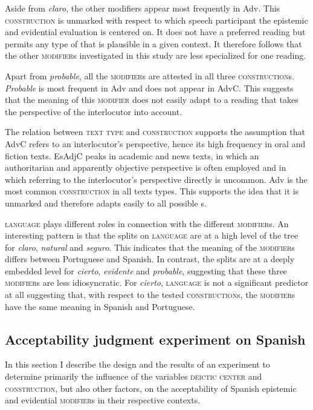 Aside from  \textit{claro}, the other modifiers  appear most frequently in Adv. This \textsc{construction} is unmarked with respect to which speech participant the epistemic and evidential evaluation is centered on. It does not have a preferred reading but permits any type of  that is plausible in a given context. It  therefore follows that the other \textsc{modifier}s investigated in this study are less specialized for one reading.  


Apart from \textit{probable}, all the \textsc{modifier}s are attested in all  three \textsc{construction}s. \textit{Probable} is most frequent in Adv and does not appear in AdvC. This suggests that the meaning of this \textsc{modifier} does not easily adapt to a reading that takes the perspective of the interlocutor into account.

The relation between \textsc{text type} and \textsc{construction} supports the assumption that AdvC refers to an interlocutor's perspective, hence its high frequency in oral and fiction texts. EsAdjC peaks in academic and news texts, in which an authoritarian and apparently objective perspective is often employed and in which referring to the interlocutor's perspective directly is uncommon. Adv is the most common \textsc{construction} in all texts types. This supports the idea that it is unmarked and therefore adapts easily to all possible s.

\textsc{language} plays  different roles in connection with the different \textsc{modifier}s. An interesting pattern is that the splits on \textsc{language} are at a high level of the tree for \textit{claro}, \textit{natural} and \textit{seguro}. This indicates that the meaning of the \textsc{modifier}s differs between Portuguese and Spanish. In contrast, the splits are at a deeply embedded level for \textit{cierto}, \textit{evidente} and \textit{probable},  suggesting that these three \textsc{modifier}s are less idiosyncratic. For \textit{cierto}, \textsc{language} is not a significant predictor at all suggesting that, with respect to the tested \textsc{construction}s,  the \textsc{modifier}s have the same  meaning in Spanish and Portuguese.

\subsection{Acceptability judgment experiment on Spanish}
In this section I describe the design and the results of an experiment to determine primarily the influence of the variables \textsc{deictic center} and \textsc{construction}, but also other factors,   on the acceptability of Spanish epistemic and evidential \textsc{modifier}s in their respective contexts.

